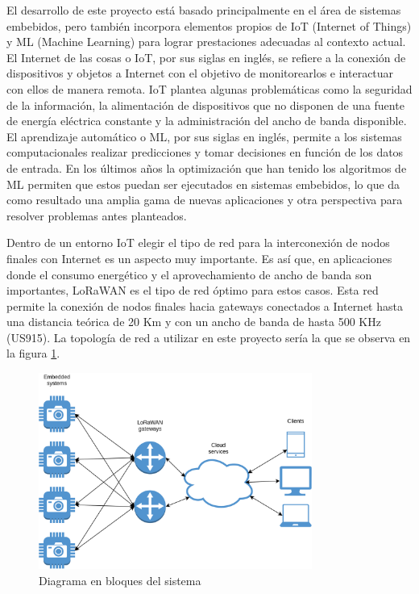 \documentclass[
11pt, %
]{plan}
\begin{document}
El desarrollo de este proyecto está basado principalmente en el área de sistemas embebidos, pero también incorpora elementos propios de IoT (Internet of Things) y ML (Machine Learning) para lograr prestaciones adecuadas al contexto actual. El Internet de las cosas o IoT, por sus siglas en inglés, se refiere a la conexión de dispositivos y objetos a Internet con el objetivo de monitorearlos e interactuar con ellos de manera remota. IoT plantea algunas problemáticas como la seguridad de la información, la alimentación de dispositivos que no disponen de una fuente de energía eléctrica constante y la administración del ancho de banda disponible. El aprendizaje automático o ML, por sus siglas en inglés, permite a los sistemas computacionales realizar predicciones y tomar decisiones en función de los datos de entrada. En los últimos años la optimización que han tenido los algoritmos de ML permiten que estos puedan ser ejecutados en sistemas embebidos, lo que da como resultado una amplia gama de nuevas aplicaciones y otra perspectiva para resolver problemas antes planteados.

Dentro de un entorno IoT elegir el tipo de red para la interconexión de nodos finales con Internet es un aspecto muy importante. Es así que, en aplicaciones donde el consumo energético y el aprovechamiento de ancho de banda son importantes, LoRaWAN es el tipo de red óptimo para estos casos. Esta red permite la conexión de nodos finales hacia gateways conectados a Internet hasta una distancia teórica de 20 Km y con un ancho de banda de hasta 500 KHz (US915). La topología de red a utilizar en este proyecto sería la que se observa en la figura \ref{fig:topology}.

\begin{figure}[htpb]
\centering
\includegraphics[width=0.8\textwidth]{./fig/topology.png}
\caption{Diagrama en bloques del sistema}
\label{fig:topology}
\end{figure}
\end{document}
